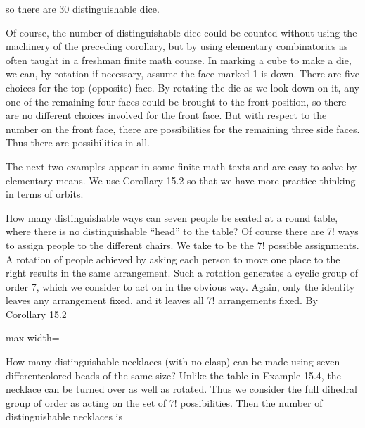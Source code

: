 \documentclass[11pt,oneside]{article}
\begin{document}
\begin{BookBody}
\noindent so there are 30 distinguishable dice. \BookEnd{\blacktriangle}

Of course, the number of distinguishable dice could be counted without using the machinery of the preceding corollary, but by using elementary combinatorics as often taught in a freshman finite math course. In marking a cube to make a die, we can, by rotation if necessary, assume the face marked 1 is down. There are five choices for the top (opposite) face. By rotating the die as we look down on it, any one of the remaining four faces could be brought to the front position, so there are no different choices involved for the front face. But with respect to the number on the front face, there are  possibilities for the remaining three side faces. Thus there are \BookInline{5\cdot 3\cdot }  possibilities in all.

The next two examples appear in some finite math texts and are easy to solve by elementary means. We use Corollary 15.2 so that we have more practice thinking in terms of orbits.

 How many distinguishable ways can seven people be seated at a round table, where there is no distinguishable “head” to the table? Of course there are 7! ways to assign people to the different chairs. We take  to be the 7! possible assignments. A rotation of people achieved by asking each person to move one place to the right results in the same arrangement. Such a rotation generates a cyclic group  of order 7, which we consider to act on  in the obvious way. Again, only the identity  leaves any arrangement fixed, and it leaves all 7! arrangements fixed. By Corollary 15.2

\begin{center}\begin{adjustbox}{max width=\linewidth}\end{adjustbox}\end{center} \BookEnd{\blacktriangle}

 How many distinguishable necklaces (with no clasp) can be made using seven differentcolored beads of the same size? Unlike the table in Example 15.4, the necklace can be turned over as well as rotated. Thus we consider the full dihedral group  of order  as acting on the set  of 7! possibilities. Then the number of distinguishable necklaces is


\end{BookBody}
\end{document}
